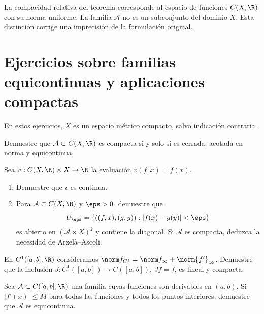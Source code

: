 \begin{observacion}
La compacidad relativa del teorema corresponde al espacio de funciones $C(X,\R)$ con su norma uniforme. La familia $\mathcal A$ no es un subconjunto del dominio $X$. Esta distinción corrige una imprecisión de la formulación original.
\end{observacion}

\section{Ejercicios sobre familias equicontinuas y aplicaciones compactas}
En estos ejercicios, $X$ es un espacio métrico compacto, salvo indicación contraria.
\begin{ejercicio}\label{ej:lectura-27-1}
Demuestre que $\mathcal A\subset C(X,\R)$ es compacta si y solo si es cerrada, acotada en norma y equicontinua.
\end{ejercicio}


\begin{ejercicio}\label{ej:lectura-27-2}
Sea $v:C(X,\R)\times X\to\R$ la evaluación $v(f,x)=f(x)$.
\begin{enumerate}[label=(\roman*)]
\item Demuestre que $v$ es continua.
\item Para $\mathcal A\subset C(X,\R)$ y $\eps>0$, demuestre que
\[
 U_\eps=\{((f,x),(g,y)):|f(x)-g(y)|<\eps\}
\]
es abierto en $(\mathcal A\times X)^2$ y contiene la diagonal. Si $\mathcal A$ es compacta, deduzca la necesidad de Arzelà--Ascoli.
\end{enumerate}
\end{ejercicio}


\begin{ejercicio}\label{ej:lectura-27-3}
En $C^1([a,b],\R)$ consideramos $\norm f_{C^1}=\norm f_\infty+\norm{f'}_\infty$. Demuestre que la inclusión $J:C^1([a,b])\to C([a,b])$, $Jf=f$, es lineal y compacta.
\end{ejercicio}


\begin{ejercicio}\label{ej:lectura-27-4}
Sea $\mathcal A\subset C([a,b],\R)$ una familia cuyas funciones son derivables en $(a,b)$. Si $|f'(x)|\le M$ para todas las funciones y todos los puntos interiores, demuestre que $\mathcal A$ es equicontinua.
\end{ejercicio}


